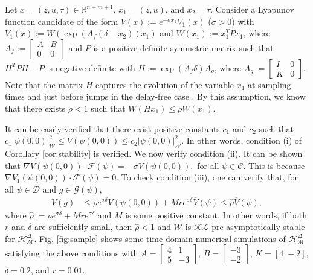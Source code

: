\documentclass[journal,final,twocolumn]{IEEEtran}
\theoremstyle{definition}
\begin{document}
Let $x=(z,u,\tau)\in{\mathbb R}^{n+m+1}$, $x_1=(z,u)$, and $x_2=\tau$. Consider a Lyapunov function candidate of the form $V(x):=e^{-\sigma x_2}V_1(x)$ ($\sigma>0$) with
$
V_1(x):=W(\exp(A_f(\delta-x_2))x_1)
$
and $W(x_1):=x_1^TPx_1$, where $A_f:=\begin{bmatrix}A & B\\
0 & 0
\end{bmatrix}$ and $P$ is a positive definite symmetric matrix such that $H^TPH-P$ is negative definite with $H:=\exp(A_f\delta)A_g$, where $A_g:=\begin{bmatrix}I & 0\\
K & 0
\end{bmatrix}$. Note that the matrix $H$ captures the evolution of the variable $x_1$ at sampling times and just before jumps in the delay-free case \cite{goebel2012hybrid}. By this assumption, we know that there exists $\rho<1$ such that $W(Hx_1)\le \rho W(x_1)$.

It can be easily verified that there exist positive constants $c_1$ and $c_2$ such that
$
c_1{\left\vert{\psi(0,0)}\right\vert}_{\mathcal{W}}^2\le V(\psi(0,0))\le c_2 {\left\vert{\psi(0,0)}\right\vert}_{\mathcal{W}}^2.
$
In other words, condition (i) of Corollary \ref{cor:stability} is verified. We now verify condition (ii). It can be shown that
$\nabla V(\psi(0,0))\cdot {\mathcal{F}}(\psi) = -\sigma V(\psi(0,0)),$ for all $\psi\in {\mathcal{C}}$. This is because $\nabla V_1(\psi(0,0))\cdot {\mathcal{F}}(\psi) =0$. To check  condition (iii), one can verify that, for all $\psi\in{\mathcal{D}}$ and $g\in{\mathcal{G}} (\psi)$,
\begin{align*}
V(g) & \le \rho e^{\sigma \delta} V(\psi(0,0))+ M r e^{\sigma \delta} \overline{V}(\psi) \le \hat{\rho}\overline{V}(\psi),
\end{align*}
where $\hat{\rho}:=\rho e^{\sigma \delta}+ M r e^{\sigma \delta}$ and $M$ is some positive constant. In other words, if both $r$ and $\delta$ are sufficiently small, then $\hat{\rho}<1$ and ${\mathcal{W}}$ is ${\mathcal{KL}}$ pre-asymptotically stable for ${\mathcal{H}_{\mathcal{M}}^{\Delta}}$. Fig. \ref{fig:sample} shows some time-domain numerical simulations of ${\mathcal{H}_{\mathcal{M}}^{\Delta}}$ satisfying the above conditions with 
$A=\begin{bmatrix}4 & 1\\
5 & -3
\end{bmatrix}$, $B=\begin{bmatrix}-3\\-2\end{bmatrix}$, $K=[4\;-2]$, $\delta=0.2$, and $r=0.01$.
\end{document}
